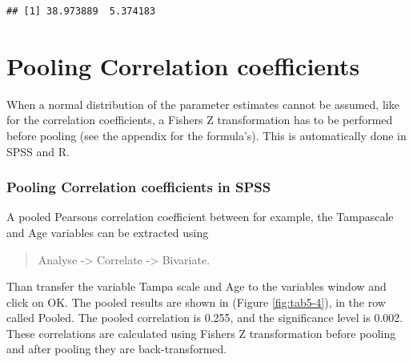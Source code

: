 \documentclass[]{book}
\theoremstyle{definition}
\theoremstyle{definition}
\theoremstyle{definition}
\theoremstyle{remark}
\begin{document}
\begin{verbatim}
## [1] 38.973889  5.374183
\end{verbatim}

\section{Pooling Correlation
coefficients}\label{pooling-correlation-coefficients}

When a normal distribution of the parameter estimates cannot be assumed,
like for the correlation coefficients, a Fishers Z transformation has to
be performed before pooling (see the appendix for the formula's). This
is automatically done in SPSS and R.

\subsubsection{Pooling Correlation coefficients in
SPSS}\label{pooling-correlation-coefficients-in-spss}

A pooled Pearsons correlation coefficient between for example, the
Tampascale and Age variables can be extracted using

\begin{quote}
Analyse -\textgreater{} Correlate -\textgreater{} Bivariate.
\end{quote}

Than transfer the variable Tampa scale and Age to the variables window
and click on OK. The pooled results are shown in (Figure
\ref{fig:tab5-4}), in the row called Pooled. The pooled correlation is
0.255, and the significance level is 0.002. These correlations are
calculated using Fishers Z transformation before pooling and after
pooling they are back-transformed.
\end{document}

